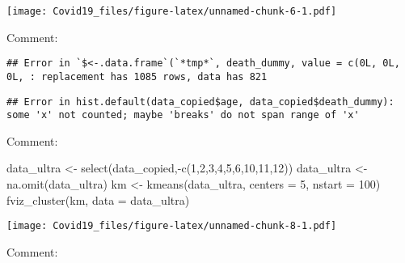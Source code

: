 \documentclass[
]{article}
\newenvironment{Shaded}{\begin{snugshade}}{\end{snugshade}}
\newcommand{\AttributeTok}[1]{\textcolor[rgb]{0.77,0.63,0.00}{#1}}
\newcommand{\DecValTok}[1]{\textcolor[rgb]{0.00,0.00,0.81}{#1}}
\newcommand{\FunctionTok}[1]{\textcolor[rgb]{0.00,0.00,0.00}{#1}}
\newcommand{\NormalTok}[1]{#1}
\newcommand{\OtherTok}[1]{\textcolor[rgb]{0.56,0.35,0.01}{#1}}
\newcommand{\SpecialCharTok}[1]{\textcolor[rgb]{0.00,0.00,0.00}{#1}}
\begin{document}
\texttt{[image: Covid19\_files/figure-latex/unnamed-chunk-6-1.pdf]}

Comment:

\begin{Shaded}
\end{Shaded}

\begin{verbatim}
## Error in `$<-.data.frame`(`*tmp*`, death_dummy, value = c(0L, 0L, 0L, : replacement has 1085 rows, data has 821
\end{verbatim}

\begin{Shaded}
\end{Shaded}

\begin{verbatim}
## Error in hist.default(data_copied$age, data_copied$death_dummy): some 'x' not counted; maybe 'breaks' do not span range of 'x'
\end{verbatim}

Comment:

\begin{Shaded}
\begin{Highlighting}[]
\NormalTok{data\_ultra }\OtherTok{\textless{}{-}} \FunctionTok{select}\NormalTok{(data\_copied,}\SpecialCharTok{{-}}\FunctionTok{c}\NormalTok{(}\DecValTok{1}\NormalTok{,}\DecValTok{2}\NormalTok{,}\DecValTok{3}\NormalTok{,}\DecValTok{4}\NormalTok{,}\DecValTok{5}\NormalTok{,}\DecValTok{6}\NormalTok{,}\DecValTok{10}\NormalTok{,}\DecValTok{11}\NormalTok{,}\DecValTok{12}\NormalTok{))}
\NormalTok{data\_ultra }\OtherTok{\textless{}{-}} \FunctionTok{na.omit}\NormalTok{(data\_ultra)}
\NormalTok{km }\OtherTok{\textless{}{-}} \FunctionTok{kmeans}\NormalTok{(data\_ultra, }\AttributeTok{centers =} \DecValTok{5}\NormalTok{, }\AttributeTok{nstart =} \DecValTok{100}\NormalTok{)}
\FunctionTok{fviz\_cluster}\NormalTok{(km, }\AttributeTok{data =}\NormalTok{ data\_ultra)}
\end{Highlighting}
\end{Shaded}

\texttt{[image: Covid19\_files/figure-latex/unnamed-chunk-8-1.pdf]}

Comment:
\end{document}
